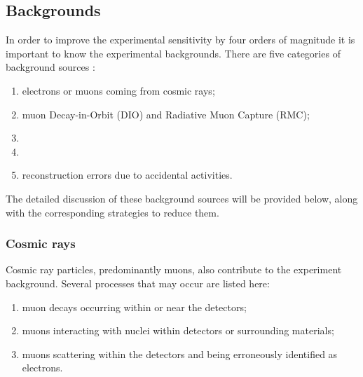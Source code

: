 \subsection{Backgrounds}\label{backgrounds}
In order to improve the experimental sensitivity by four orders of magnitude 
it is important to know the experimental backgrounds. 
There are five categories of background 
sources \cite{bartoszek2015mu2e}:
\begin{enumerate}
\item electrons or muons coming from cosmic rays;
\item {}

  muon Decay-in-Orbit (DIO) and Radiative Muon Capture (RMC);
\item
  \item
    
\item
  {\red reconstruction errors due to accidental activities.}
 
\end{enumerate}
The detailed discussion of these background sources will be provided below, along with the 
corresponding strategies to reduce  
them. 
\subsubsection{Cosmic rays}
Cosmic ray particles, predominantly muons, also contribute to the experiment 
background. Several processes that may occur are listed here:
\begin{enumerate}
    \item muon decays occurring within or near the detectors;
    \item muons interacting with nuclei within detectors or surrounding materials;
    \item muons scattering within the detectors and being erroneously identified as electrons.
    
\end{enumerate}

